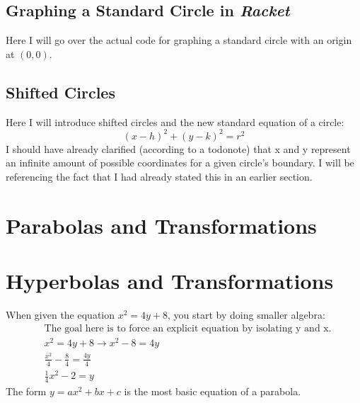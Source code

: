 \documentclass[12pt, letterpaper]{article}
\newcommand{\iRac}{\textit{Racket}}
\begin{document}
	\subsection{Graphing a Standard Circle in \iRac}
	Here I will go over the actual code for graphing a standard circle with an origin at \((0,0)\).
	
	\subsection{Shifted Circles}
	Here I will introduce shifted circles and the new standard equation of a circle:
	\begin{equation*}
		(x - h)^2 + (y - k)^2 = r^2
	\end{equation*}
	I should have already clarified (according to a todonote) that x and y represent an infinite amount of possible coordinates for a given circle's boundary. I will be referencing the fact that I had already stated this in an earlier section.
	
	\section{Parabolas and Transformations}
	\section{Hyperbolas and Transformations}
	When given the equation \(x^2 = 4y + 8\), you start by doing smaller algebra:
	\begin{equation*}
	\begin{split}
		&\text{The goal here is to force an explicit equation by isolating y and x.} \\
		&x^2 = 4y + 8 \longrightarrow x^{2}-8 = 4y \\
		&\frac{x^2}{4} -\frac{8}{4} = \frac{4y}{4} \\
		&\frac{1}{4}x^{2} -2 = y
	\end{split}
	\end{equation*}
	The form \(y = ax^2 + bx + c\) is the most basic equation of a parabola.
	
\end{document}
